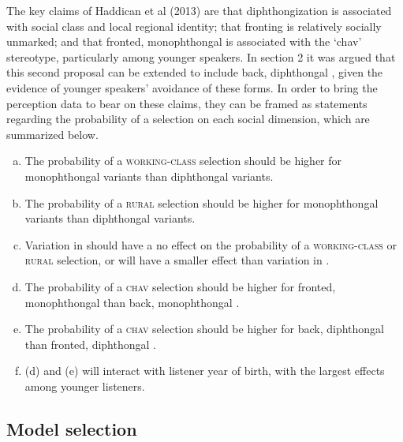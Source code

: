 \documentclass[PWPL]{article}
\begin{document}
The key claims of Haddican et al (2013) are that  diphthongization is associated with social class and local regional identity; that  fronting is relatively socially unmarked; and that fronted, monophthongal  is associated with the `chav' stereotype, particularly among younger speakers. In section 2 it was argued that this second proposal can be extended to include back, diphthongal , given the evidence of younger speakers' avoidance of these forms. In order to bring the perception data to bear on these claims, they can be framed as statements regarding the probability of a selection on each social dimension, which are summarized below. 
\begin{enumerate}[(a)]
\item{The probability of a \textsc{working-class} selection should be higher for monophthongal  variants than diphthongal  variants.}
\item{The probability of a \textsc{rural} selection should be higher for monophthongal  variants than diphthongal  variants.}
\item{Variation in  should have a no effect on the probability of a \textsc{working-class} or \textsc{rural} selection, or will have a smaller effect than variation in .}
\item{The probability of a \textsc{chav} selection should be higher for fronted, monophthongal  than back, monophthongal .}
\item{The probability of a \textsc{chav} selection should be higher for back, diphthongal  than fronted, diphthongal .}
\item{(d) and (e) will interact with listener year of birth, with the largest effects among younger listeners.}
\end{enumerate}

\subsection{Model selection}
\end{document}

